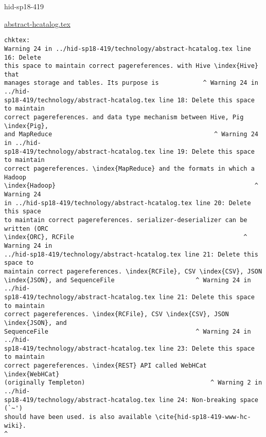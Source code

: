 \begin{IU}

hid-sp18-419

\href{https://github.com/cloudmesh-community/hid-sp18-419/blob/master//technology/abstract-hcatalog.tex}{abstract-hcatalog.tex}

\begin{tiny}
\begin{verbatim}
chktex:
Warning 24 in ../hid-sp18-419/technology/abstract-hcatalog.tex line 16: Delete
this space to maintain correct pagereferences. with Hive \index{Hive} that
manages storage and tables. Its purpose is            ^ Warning 24 in ../hid-
sp18-419/technology/abstract-hcatalog.tex line 18: Delete this space to maintain
correct pagereferences. and data type mechanism between Hive, Pig \index{Pig},
and MapReduce                                            ^ Warning 24 in ../hid-
sp18-419/technology/abstract-hcatalog.tex line 19: Delete this space to maintain
correct pagereferences. \index{MapReduce} and the formats in which a Hadoop
\index{Hadoop}                                                      ^ Warning 24
in ../hid-sp18-419/technology/abstract-hcatalog.tex line 20: Delete this space
to maintain correct pagereferences. serializer-deserializer can be written (ORC
\index{ORC}, RCFile                                              ^ Warning 24 in
../hid-sp18-419/technology/abstract-hcatalog.tex line 21: Delete this space to
maintain correct pagereferences. \index{RCFile}, CSV \index{CSV}, JSON
\index{JSON}, and SequenceFile                      ^ Warning 24 in ../hid-
sp18-419/technology/abstract-hcatalog.tex line 21: Delete this space to maintain
correct pagereferences. \index{RCFile}, CSV \index{CSV}, JSON \index{JSON}, and
SequenceFile                                        ^ Warning 24 in ../hid-
sp18-419/technology/abstract-hcatalog.tex line 23: Delete this space to maintain
correct pagereferences. \index{REST} API called WebHCat \index{WebHCat}
(originally Templeton)                                  ^ Warning 2 in ../hid-
sp18-419/technology/abstract-hcatalog.tex line 24: Non-breaking space (`~')
should have been used. is also available \cite{hid-sp18-419-www-hc-wiki}.
^
\end{verbatim}
\end{tiny}
\end{IU}



